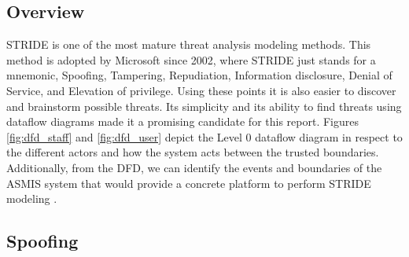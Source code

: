 \subsection{Overview}
STRIDE is one of the most mature threat analysis modeling methods. This method is adopted by Microsoft since 2002, where STRIDE just stands for a mnemonic, Spoofing, Tampering, Repudiation, Information disclosure, Denial of Service, and Elevation of privilege. Using these points it is also easier to discover and brainstorm possible threats. Its simplicity and its ability to find threats using dataflow diagrams made it a promising candidate for this report.\newline\newline
Figures \ref{fig:dfd_staff} and \ref{fig:dfd_user} depict the Level 0 dataflow diagram in respect to the different actors and how the system acts between the trusted boundaries. Additionally, from the DFD, we can identify the events and boundaries of the ASMIS system that would provide a concrete platform to perform STRIDE modeling \citep[p.~1]{shevchenko2018threat}.

\subsection{Spoofing}
